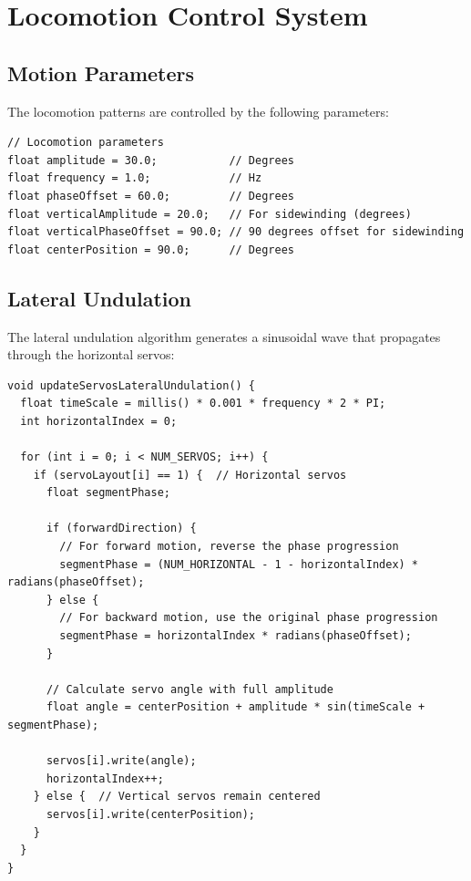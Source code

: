 \documentclass[12pt,a4paper]{report}
\begin{document}
\section{Locomotion Control System}

\subsection{Motion Parameters}
The locomotion patterns are controlled by the following parameters:

\begin{verbatim}
// Locomotion parameters
float amplitude = 30.0;           // Degrees
float frequency = 1.0;            // Hz
float phaseOffset = 60.0;         // Degrees
float verticalAmplitude = 20.0;   // For sidewinding (degrees)
float verticalPhaseOffset = 90.0; // 90 degrees offset for sidewinding
float centerPosition = 90.0;      // Degrees
\end{verbatim}

\subsection{Lateral Undulation}
The lateral undulation algorithm generates a sinusoidal wave that propagates through the horizontal servos:

\begin{verbatim}
void updateServosLateralUndulation() {
  float timeScale = millis() * 0.001 * frequency * 2 * PI;
  int horizontalIndex = 0;
  
  for (int i = 0; i < NUM_SERVOS; i++) {
    if (servoLayout[i] == 1) {  // Horizontal servos
      float segmentPhase;
      
      if (forwardDirection) {
        // For forward motion, reverse the phase progression
        segmentPhase = (NUM_HORIZONTAL - 1 - horizontalIndex) * radians(phaseOffset);
      } else {
        // For backward motion, use the original phase progression
        segmentPhase = horizontalIndex * radians(phaseOffset);
      }
      
      // Calculate servo angle with full amplitude
      float angle = centerPosition + amplitude * sin(timeScale + segmentPhase);
      
      servos[i].write(angle);
      horizontalIndex++;
    } else {  // Vertical servos remain centered
      servos[i].write(centerPosition);
    }
  }
}
\end{verbatim}
\end{document}
